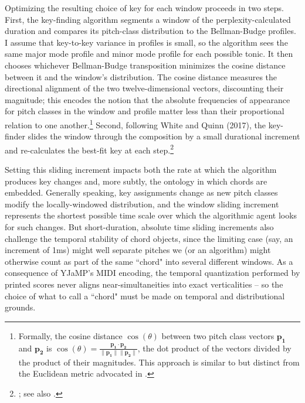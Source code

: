 Optimizing the resulting choice of key for each window proceeds in two steps.  First, the key-finding algorithm segments a window of the perplexity-calculated duration and compares its pitch-class distribution to the Bellman-Budge profiles.  I assume that key-to-key variance in profiles is small, so the algorithm sees the same major mode profile and minor mode profile for each possible tonic.  It then chooses whichever Bellman-Budge transposition minimizes the cosine distance between it and the window's distribution.  The cosine distance measures the directional alignment of the two twelve-dimensional vectors, discounting their magnitude; this encodes the notion that the absolute frequencies of appearance for pitch classes in the window and profile matter less than their proportional relation to one another.\footnote{Formally, the cosine distance $\cos(\theta)$ between two pitch class vectors $\mathbf{p_1}$ and $\mathbf{p_2}$ is $\cos(\theta) = \frac{\mathbf{p_1} \cdot \mathbf{p_2}}{\| \mathbf{p_1} \| \| \mathbf{p_2} \|}$, the dot product of the vectors divided by the product of their magnitudes.  This approach is similar to but distinct from the Euclidean metric advocated in \cite{albrecht2013}.}  Second, following White and Quinn (2017), the key-finder slides the window through the composition by a small durational increment and re-calculates the best-fit key at each step.\footnote{\cite{wq2017}; see also \cite{white2013}.}

Setting this sliding increment impacts both the rate at which the algorithm produces key changes and, more subtly, the ontology in which chords are embedded.  Generally speaking, key assignments change as new pitch classes modify the locally-windowed distribution, and the window sliding increment represents the shortest possible time scale over which the algorithmic agent looks for such changes.  But short-duration, absolute time sliding increments also challenge the temporal stability of chord objects, since the limiting case (say, an increment of 1ms) might well separate pitches we (or an algorithm) might otherwise count as part of the same ``chord" into several different windows.  As a consequence of YJaMP's MIDI encoding, the temporal quantization performed by printed scores never aligns near-simultaneities into exact verticalities -- so the choice of what to call a ``chord" must be made on temporal and distributional grounds.

